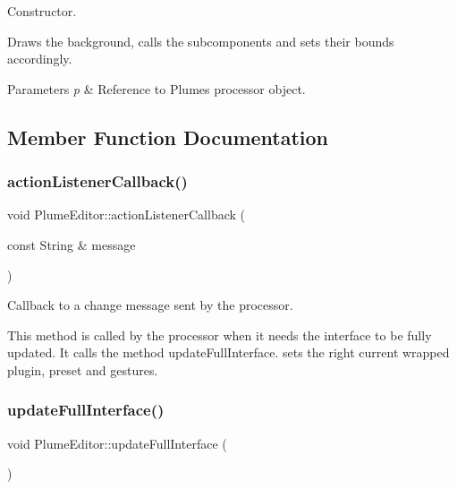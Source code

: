 Constructor. 

Draws the background, calls the subcomponents and sets their bounds accordingly.


\begin{DoxyParams}{Parameters}
{\em p} & Reference to Plume\textquotesingle{}s processor object. \\
\hline
\end{DoxyParams}


\subsection{Member Function Documentation}
\mbox{\label{class_plume_editor_a04371047171d9eab921db9e8e7011bb8}} 
\subsubsection{\texorpdfstring{action\+Listener\+Callback()}{actionListenerCallback()}}
{\footnotesize\ttfamily void Plume\+Editor\+::action\+Listener\+Callback (\begin{DoxyParamCaption}\item[{const String \&}]{message }\end{DoxyParamCaption})\hspace{0.3cm}{\ttfamily [override]}}



Callback to a change message sent by the processor. 

This method is called by the processor when it needs the interface to be fully updated. It calls the method update\+Full\+Interface. sets the right current wrapped plugin, preset and gestures. \mbox{\label{class_plume_editor_acddc96d095aeb53f7a4ee6cf1f3265e6}} 
\subsubsection{\texorpdfstring{update\+Full\+Interface()}{updateFullInterface()}}
{\footnotesize\ttfamily void Plume\+Editor\+::update\+Full\+Interface (\begin{DoxyParamCaption}{ }\end{DoxyParamCaption})}



